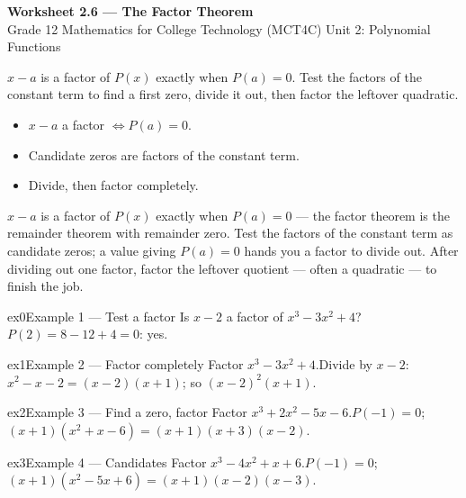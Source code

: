\documentclass[11pt]{article}
\begin{document}
\begin{center}
{\LARGE\bfseries\color{titleblue}Worksheet 2.6 --- The Factor Theorem}\\[2pt]
{\small Grade 12 Mathematics for College Technology (MCT4C) \textperiodcentered{} Unit 2: Polynomial Functions}
\end{center}

\begin{ideabox}
$x-a$ is a factor of $P(x)$ exactly when $P(a)=0$. Test the factors of the constant term to find a first zero, divide it out, then factor the leftover quadratic.
\begin{itemize}[leftmargin=*,itemsep=2pt]
  \item $x-a$ a factor $\Leftrightarrow P(a)=0$.
  \item Candidate zeros are factors of the constant term.
  \item Divide, then factor completely.
\end{itemize}
\end{ideabox}

\begin{learnbox}
$x-a$ is a factor of $P(x)$ exactly when $P(a)=0$ — the factor theorem is the remainder theorem with remainder zero.
Test the factors of the constant term as candidate zeros; a value giving $P(a)=0$ hands you a factor to divide out.
After dividing out one factor, factor the leftover quotient — often a quadratic — to finish the job.
\end{learnbox}


\begin{example}{ex0}{Example 1 --- Test a factor}
Is $x-2$ a factor of $x^3-3x^2+4$?\soln $P(2)=8-12+4=0$: yes.
\end{example}

\begin{example}{ex1}{Example 2 --- Factor completely}
Factor $x^3-3x^2+4$.\soln Divide by $x-2$: $x^2-x-2=(x-2)(x+1)$; so $(x-2)^2(x+1)$.
\end{example}

\begin{example}{ex2}{Example 3 --- Find a zero, factor}
Factor $x^3+2x^2-5x-6$.\soln $P(-1)=0$; $(x+1)(x^2+x-6)=(x+1)(x+3)(x-2)$.
\end{example}

\begin{example}{ex3}{Example 4 --- Candidates}
Factor $x^3-4x^2+x+6$.\soln $P(-1)=0$; $(x+1)(x^2-5x+6)=(x+1)(x-2)(x-3)$.
\end{example}
\end{document}
